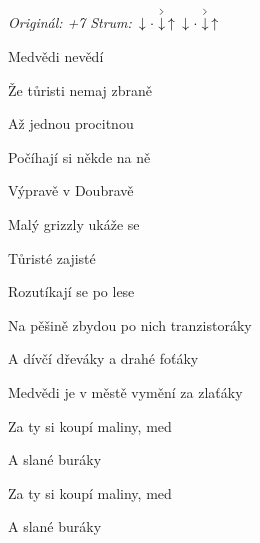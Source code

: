 \begin{song}


\begin{headerbox}
\RaiseBoxWithAccents
\textit{Originál: +7} \quad
\textit{Strum:} $\Down\Miss\AccentDown\Up\ \Down\Miss\AccentDown\Up$
\end{headerbox}

\begin{hchordbox}
\end{hchordbox}

\Large

\bigskip

Medvědi nevědí \par
{}Že tůristi nemaj zbraně \par
{}Až jednou procitnou \par
{}Počíhají si někde na ně \par

\bigskip

Výpravě v Doubravě \par
{}Malý grizzly ukáže se \par
{}Tůristé zajisté \par
{}Rozutíkají se po lese \par

\bigskip

Na pěšině zbydou po nich tranzistoráky  \par
A dívčí dřeváky  a drahé foťáky  \par
{}Medvědi je v městě vymění za zlaťáky \par
{}Za ty si koupí maliny, med  \par
A slané buráky  \par
{}Za ty si koupí maliny, med  \par
A slané buráky \par

\end{song}
